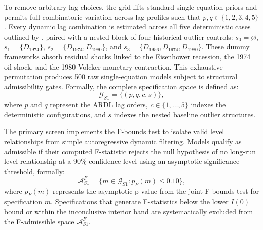 \documentclass[11pt]{article}
\begin{document}
To remove arbitrary lag choices, the grid lifts standard single-equation priors and permits full combinatoric variation across lag profiles such that $p,q \in \{1,2,3,4,5\}$. Every dynamic lag combination is estimated across all five deterministic cases outlined by \citet{Pesaran2001}, paired with a nested block of four historical outlier controls: $s_0=\varnothing$, $s_1=\{D_{1974}\}$, $s_2=\{D_{1974},D_{1980}\}$, and $s_3=\{D_{1956},D_{1974},D_{1980}\}$. These dummy frameworks absorb residual shocks linked to the Eisenhower recession, the 1974 oil shock, and the 1980 Volcker monetary contraction. This exhaustive permutation produces 500 raw single-equation models subject to structural admissibility gates. Formally, the complete specification space is defined as:
\begin{equation}
\mathcal{G}_{S1} = \{(p,q,c,s)\},
\label{eq:G_S1}
\end{equation}
where $p$ and $q$ represent the ARDL lag orders, $c \in \{1,\dots,5\}$ indexes the deterministic configurations, and $s$ indexes the nested baseline outlier structures.

The primary screen implements the F-bounds test to isolate valid level relationships from simple autoregressive dynamic filtering. Models qualify as admissible if their computed F-statistic rejects the null hypothesis of no long-run level relationship at a 90\% confidence level using an asymptotic significance threshold, formally:
\begin{equation}
\mathcal{A}^{F}_{S1} = \{ m \in \mathcal{G}_{S1} : p_F(m) \leq 0.10 \},
\label{eq:A_F_S1}
\end{equation}
where $p_F(m)$ represents the asymptotic p-value from the joint F-bounds test for specification $m$. Specifications that generate F-statistics below the lower $I(0)$ bound or within the inconclusive interior band are systematically excluded from the F-admissible space $\mathcal{A}^{F}_{S1}$.
\end{document}

